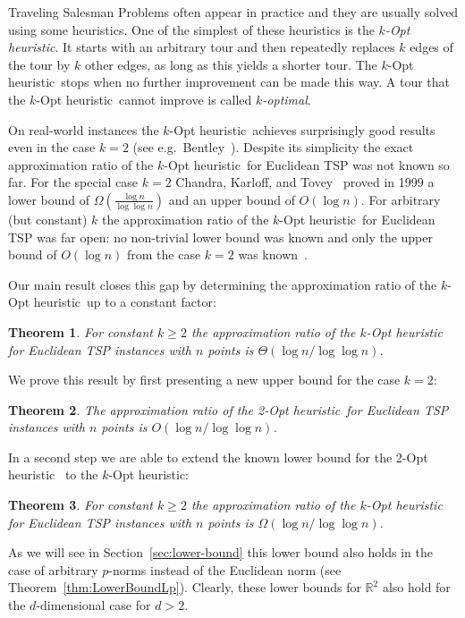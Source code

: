 \documentclass[a4paper, 11pt]{article}
\newtheorem{theorem}{Theorem}
\def\2opt{2-Opt heuristic}
\def\kopt{$k$-Opt heuristic}
\def\blue#1{#1}
\begin{document}
\blue{Traveling Salesman Problems often appear in practice and they are usually solved using some heuristics.}
One of the simplest of these heuristics is the \emph{\kopt}. 
It starts with an arbitrary tour and then repeatedly replaces $k$ edges of the tour  
by $k$ other edges, as long as this yields a shorter tour. The \kopt\ stops when no further improvement can be made this way. 
A tour that the \kopt\ cannot improve is called \emph{$k$-optimal}.

On real-world instances the \kopt\ achieves surprisingly good results even in the case $k=2$ (see e.g.\ Bentley~\cite{Ben1992}). 
Despite its simplicity the exact approximation ratio of the \kopt\ for Euclidean TSP was not known so far. 
For the special case $k=2$ Chandra, Karloff, and Tovey~\cite{CKT1999} proved in 1999
a lower bound of $\Omega(\frac{\log n}{\log \log n})$ and an upper bound of $O(\log n)$.
For arbitrary (but constant) $k$ the approximation ratio of the \kopt\ for Euclidean TSP was far open: 
no non-trivial lower bound was known and only the upper bound of $O(\log n)$ from the case $k=2$ was known~\cite{CKT1999}.

Our main result closes this gap by determining the approximation ratio of the \kopt\ up to a constant factor: 

\begin{theorem} For constant $k \ge 2$ the 
approximation ratio of the $k$-Opt heuristic for Euclidean TSP instances with $n$ points is $\Theta(\log n / \log \log n)$.
\label{thm:combinedresult}
\end{theorem}

We prove this result by first presenting a new upper bound for the case $k=2$: 

\begin{theorem}
The approximation ratio of the \2opt\ for Euclidean TSP instances with $n$ points is $O(\log n / \log \log n)$.
\label{thm:main}
\end{theorem}

In a second step we are able to extend the known lower bound for the \2opt~\cite{CKT1999}
to the \kopt:


\begin{theorem} For constant $k \ge 2$ the 
approximation ratio of the $k$-Opt heuristic for Euclidean TSP instances with $n$ points is $\Omega(\log n / \log \log n)$.
\label{thm:k-Opt}
\end{theorem}

As we will see in Section~\ref{sec:lower-bound} this lower bound also holds in the case of arbitrary $p$-norms instead of the Euclidean norm 
(see Theorem~\ref{thm:LowerBoundLp}). Clearly, these lower bounds for $\mathbb{R}^2$ also hold for the $d$-dimensional case for $d > 2$.
\end{document}
